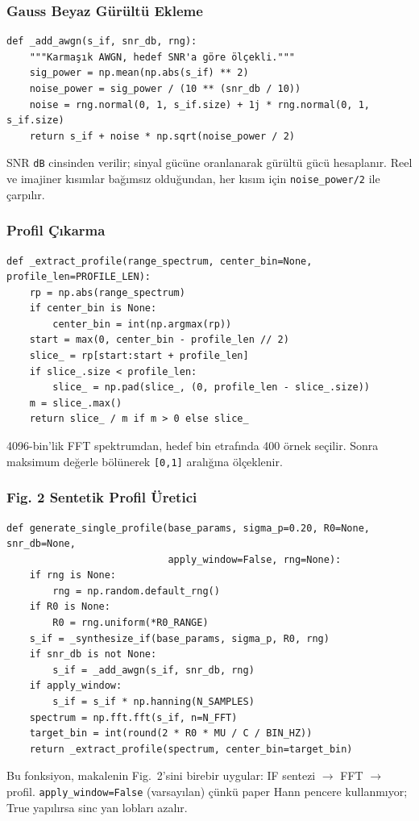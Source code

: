 \documentclass[11pt,a4paper]{article}
\begin{document}
\subsubsection{Gauss Beyaz Gürültü Ekleme}
\begin{lstlisting}[caption={SNR'a göre AWGN ekle}]
def _add_awgn(s_if, snr_db, rng):
    """Karmaşık AWGN, hedef SNR'a göre ölçekli."""
    sig_power = np.mean(np.abs(s_if) ** 2)
    noise_power = sig_power / (10 ** (snr_db / 10))
    noise = rng.normal(0, 1, s_if.size) + 1j * rng.normal(0, 1, s_if.size)
    return s_if + noise * np.sqrt(noise_power / 2)
\end{lstlisting}
SNR \texttt{dB} cinsinden verilir; sinyal gücüne oranlanarak gürültü gücü hesaplanır.
Reel ve imajiner kısımlar bağımsız olduğundan, her kısım için \texttt{noise\_power/2} ile çarpılır.

\subsubsection{Profil Çıkarma}
\begin{lstlisting}[caption={Tepe etrafından 400 örnek al ve max-normalize et}]
def _extract_profile(range_spectrum, center_bin=None, profile_len=PROFILE_LEN):
    rp = np.abs(range_spectrum)
    if center_bin is None:
        center_bin = int(np.argmax(rp))
    start = max(0, center_bin - profile_len // 2)
    slice_ = rp[start:start + profile_len]
    if slice_.size < profile_len:
        slice_ = np.pad(slice_, (0, profile_len - slice_.size))
    m = slice_.max()
    return slice_ / m if m > 0 else slice_
\end{lstlisting}
4096-bin'lik FFT spektrumdan, hedef bin etrafında 400 örnek seçilir. Sonra maksimum değerle
bölünerek \texttt{[0,1]} aralığına ölçeklenir.

\subsubsection{Fig. 2 Sentetik Profil Üretici}
\begin{lstlisting}[caption={Fig. 2 zinciri — eğitim verisi}]
def generate_single_profile(base_params, sigma_p=0.20, R0=None, snr_db=None,
                            apply_window=False, rng=None):
    if rng is None:
        rng = np.random.default_rng()
    if R0 is None:
        R0 = rng.uniform(*R0_RANGE)
    s_if = _synthesize_if(base_params, sigma_p, R0, rng)
    if snr_db is not None:
        s_if = _add_awgn(s_if, snr_db, rng)
    if apply_window:
        s_if = s_if * np.hanning(N_SAMPLES)
    spectrum = np.fft.fft(s_if, n=N_FFT)
    target_bin = int(round(2 * R0 * MU / C / BIN_HZ))
    return _extract_profile(spectrum, center_bin=target_bin)
\end{lstlisting}
Bu fonksiyon, makalenin Fig.~2'sini birebir uygular: IF sentezi $\rightarrow$ FFT $\rightarrow$
profil. \texttt{apply\_window=False} (varsayılan) çünkü paper Hann pencere kullanmıyor;
True yapılırsa sinc yan lobları azalır.
\end{document}
